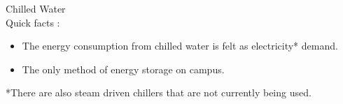 \begin{frame}

	\Large{Chilled Water}\\

	Quick facts \cite{noauthor_campus_nodate}:
	\begin{itemize}
		\item The energy consumption from chilled water is felt as electricity* demand.
		\item The only method of energy storage on campus. 
	\end{itemize}

	\small{*There are also steam driven chillers that are not currently being used.}
\end{frame}